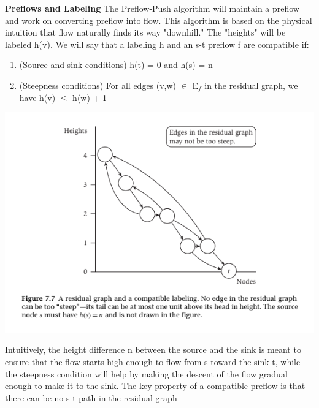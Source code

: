 \documentclass{article}
\begin{document}
\textbf{Preflows and Labeling} The Preflow-Push algorithm will maintain a preflow and work on converting preflow into flow. This algorithm is based on the physical intuition that flow naturally finds its way "downhill." The "heights" will be labeled h(v). We will say that a labeling h and an s-t preflow f are compatible if:\\

\begin{enumerate}
    \item (Source and sink conditions) h(t) = 0 and h(s) = n
    \item (Steepness conditions) For all edges (v,w) $\in$ E$_f$ in the residual graph, we have h(v) $\le$ h(w) + 1
\end{enumerate}

\begin{center}
    \includegraphics[]{figures/fig24.png}
\end{center}

Intuitively, the height difference n between the source and the sink is meant to ensure that the flow starts high enough to flow from s toward the sink t, while the steepness condition will help by making the descent of the flow gradual enough to make it to the sink. The key property of a compatible preflow is that there can be no s-t path in the residual graph\\

\\
\end{document}
